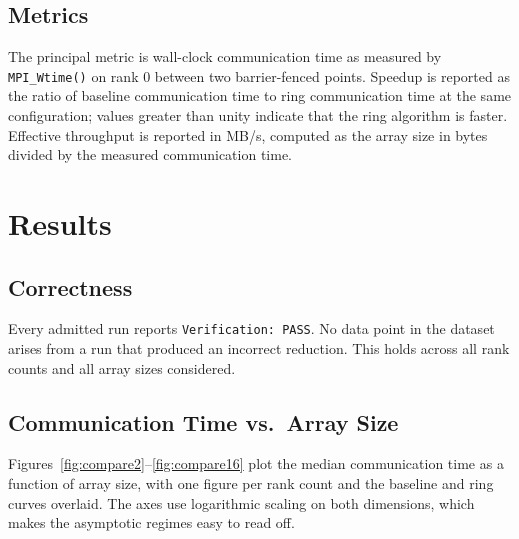 \documentclass[12pt,a4paper]{article}
\begin{document}
\subsection{Metrics}

The principal metric is wall-clock communication time as measured by \texttt{MPI\_Wtime()} on rank 0 between two barrier-fenced points. Speedup is reported as the ratio of baseline communication time to ring communication time at the same configuration; values greater than unity indicate that the ring algorithm is faster. Effective throughput is reported in MB/s, computed as the array size in bytes divided by the measured communication time.

\section{Results}
\label{sec:results}


\subsection{Correctness}

Every admitted run reports \texttt{Verification: PASS}. No data point in the dataset arises from a run that produced an incorrect reduction. This holds across all rank counts and all array sizes considered.

\subsection{Communication Time vs.\ Array Size}

Figures~\ref{fig:compare2}--\ref{fig:compare16} plot the median communication time as a function of array size, with one figure per rank count and the baseline and ring curves overlaid. The axes use logarithmic scaling on both dimensions, which makes the asymptotic regimes easy to read off.
\end{document}
